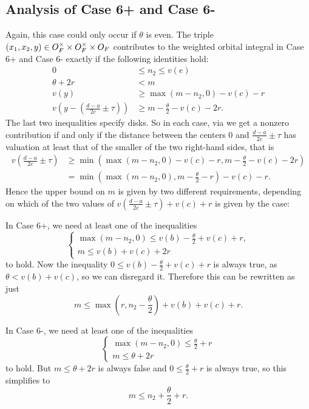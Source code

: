 \subsection{Analysis of Case 6\ts+ and Case 6\ts-}
Again, this case could only occur if $\theta$ is even.
The triple $(x_1, x_2, y) \in O_F^\times \times O_F^\times \times O_F$
contributes to the weighted orbital integral in Case 6\ts+ and Case 6\ts-
exactly if the following identities hold:
\begin{align*}
  0 &\le n_2 \le v(e) \\
  \theta + 2r &< m \\
  v(y) &\ge \max(m-n_2,0) - v(c) - r \\
  v\left( y - \left( \frac{d-a}{2c} \pm \tau \right) \right) &\ge m - \frac{\theta}{2} - v(c) - 2r.
\end{align*}
The last two inequalities specify disks.
So in each case, via 
we get a nonzero contribution if and only if the distance between the centers
$0$ and $\frac{d-a}{2c} \pm \tau$ has valuation at least
that of the smaller of the two right-hand sides, that is
\begin{align*}
  v\left( \frac{d-a}{2c} \pm \tau \right)
  &\ge \min\left( \max(m-n_2,0) - v(c) - r, m - \frac{\theta}{2} - v(c) - 2r \right) \\
  &= \min\left( \max(m-n_2,0), m - \frac{\theta}{2} - r \right) - v(c) - r.
\end{align*}
Hence the upper bound on $m$ is given by two different requirements,
depending on which of the two values of
$v\left( \frac{d-a}{2c} \pm \tau \right) + v(c) + r$ is given by the case:
\begin{itemize}
  \ii In Case 6\ts+, we need at least one of the inequalities
  \[
    \begin{cases}
    \max(m-n_2, 0) \le v(b) - \frac{\theta}{2} + v(c) + r, \\
    m \le v(b) + v(c) + 2r
    \end{cases}
  \]
  to hold.
  Now the inequality $0 \le v(b) - \frac{\theta}{2} + v(c) + r$ is always true,
  as $\theta < v(b) + v(c)$, so we can disregard it.
  Therefore this can be rewritten as just
  \[ m \le \max\left( r, n_2 - \frac{\theta}{2} \right) + v(b) + v(c) + r. \]

  \ii In Case 6\ts-, we need at least one of the inequalities
  \[
    \begin{cases}
      \max(m-n_2, 0) \le \frac{\theta}{2} + r \\
      m \le \theta + 2r
    \end{cases}
  \]
  to hold.
  But $m \le \theta+2r$ is always false and $0 \le \frac{\theta}{2} + r$ is always true,
  so this simplifies to
  \[ m \le n_2 + \frac{\theta}{2} + r. \]
\end{itemize}
